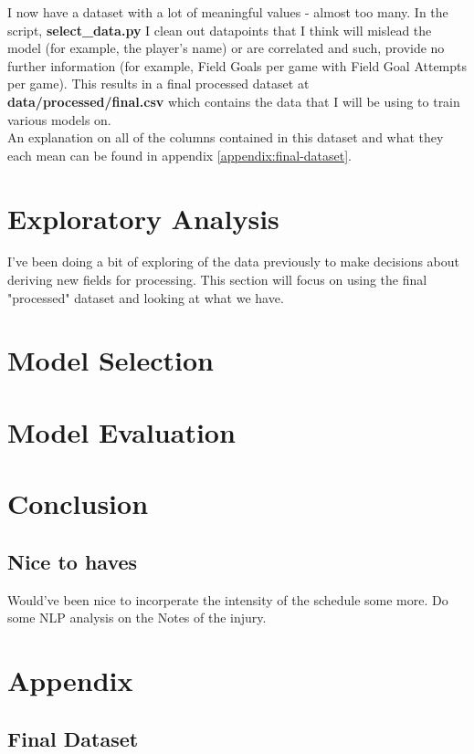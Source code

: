 \documentclass{article}
\begin{document}
I now have a dataset with a lot of meaningful values - almost too many. In the script,
\textbf{select\_data.py} I clean out datapoints that I think will mislead the model (for example, the
player's name) or are correlated and such, provide no further information (for example, Field Goals per game with Field
Goal Attempts per game).
This results in a final processed dataset at \textbf{data/processed/final.csv} which contains the
data that I will be using to train various models on.\\

An explanation on all of the columns contained in this dataset and what they each
mean can be found in appendix \ref{appendix:final-dataset}.

\newpage
\section*{Exploratory Analysis}

I've been doing a bit of exploring of the data previously to
make decisions about deriving new fields for processing.
This section will focus on using the final "processed" dataset
and looking at what we have.

\section*{Model Selection}

\section*{Model Evaluation}

\section*{Conclusion}

\subsection*{Nice to haves}

Would've been nice to incorperate the intensity of the schedule some more.
Do some NLP analysis on the Notes of the injury.

\section*{Appendix}
\label{appendix:start}


\subsection*{Final Dataset}
\end{document}
